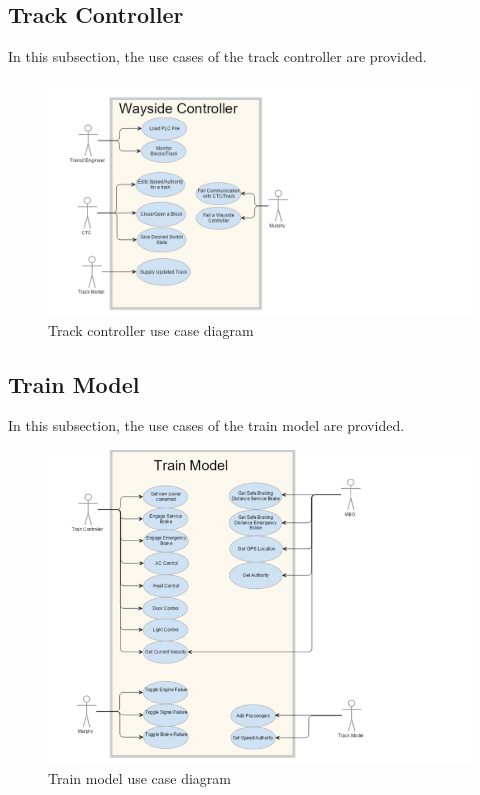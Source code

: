 \documentclass[]{article}
\begin{document}
\subsection{Track Controller}
In this subsection, the use cases of the track controller are provided.

\begin{figure}[H]
	\centering
	\includegraphics[scale=.2]{trackcontrollerusecase.png}
	\caption{Track controller use case diagram}
\end{figure}

\subsection{Train Model}
In this subsection, the use cases of the train model are provided.

\begin{figure}[H]
	\centering
	\includegraphics[scale=.2]{trainmodelusecase.png}
	\caption{Train model use case diagram}
\end{figure}
\end{document}
